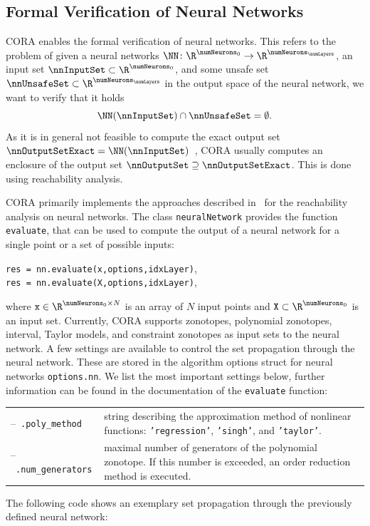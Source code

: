 \subsection{Formal Verification of Neural Networks}
\label{sec:neuralNetworkVerification}

CORA enables the formal verification of neural networks.
This refers to the problem of given a neural networks $\NN\colon\R^{\numNeurons_0}\to\R^{\numNeurons_\numLayers}$,
an input set $\nnInputSet\subset\R^{\numNeurons_0}$,
and some unsafe set $\nnUnsafeSet\subset\R^{\numNeurons_\numLayers}$ in the output space of the neural network,
we want to verify that it holds
\begin{equation}
    \NN(\nnInputSet) \cap \nnUnsafeSet = \emptyset.
\end{equation}
As it is in general not feasible to compute the exact output set $\nnOutputSetExact=\NN(\nnInputSet)$~\cite{Katz2017},
CORA usually computes an enclosure of the output set $\nnOutputSet\supseteq\nnOutputSetExact$.
This is done using reachability analysis.

CORA primarily implements the approaches described in~\cite{Kochdumper2023b,ladner2023a} for the reachability analysis on neural networks.
The class \texttt{neuralNetwork} provides the function \texttt{evaluate}, that can be used to compute the output of a neural network for a single point or a set of possible inputs:
\begin{center}
    \texttt{res = nn.evaluate(x,options,idxLayer)}, \\
    \texttt{res = nn.evaluate(X,options,idxLayer)},
\end{center}
where $\texttt{x}\in\R^{\numNeurons_0\times N}$ is an array of $N$ input points and $\texttt{X}\subset\R^{\numNeurons_0}$ is an input set.
Currently, CORA supports zonotopes, polynomial zonotopes, interval, Taylor models, and constraint zonotopes as input sets to the neural network.
A few settings are available to control the set propagation through the neural network.
These are stored in the algorithm options struct for neural networks \texttt{options.nn}.
We list the most important settings below, further information can be found in the documentation of the \texttt{evaluate} function:

\begin{center}
    \renewcommand{\arraystretch}{1.3}
    \begin{longtable}[t]{l p{11cm}}
        --~\texttt{.poly\_method} & string describing the approximation method of nonlinear functions: \texttt{'regression'}, \texttt{'singh'}, and \texttt{'taylor'}. \\
        --~\texttt{.num\_generators} & maximal number of generators of the polynomial zonotope. If this number is exceeded, an order reduction method is executed.
    \end{longtable}
\end{center}
The following code shows an exemplary set propagation through the previously defined neural network:

